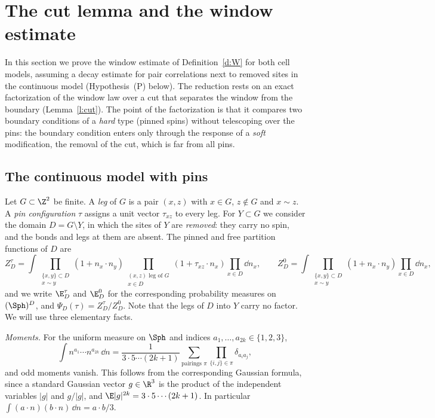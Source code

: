 \section{The cut lemma and the window estimate}\label{s:cut}

In this section we prove the window estimate of Definition~\ref{d:W} for both cell models, assuming a decay estimate for pair correlations next to removed sites in the continuous model (Hypothesis~(P) below). The reduction rests on an exact factorization of the window law over a cut that separates the window from the boundary (Lemma~\ref{l:cut}). The point of the factorization is that it compares two boundary conditions of a \emph{hard} type (pinned spins) without telescoping over the pins: the boundary condition enters only through the response of a \emph{soft} modification, the removal of the cut, which is far from all pins.

\subsection{The continuous model with pins}\label{s:contmodel}

Let $G \subset \Z^2$ be finite. A \emph{leg} of $G$ is a pair $(x, z)$ with $x \in G$, $z \notin G$ and $x \sim z$. A \emph{pin configuration} $\tau$ assigns a unit vector $\tau_{xz}$ to every leg. For $Y \subset G$ we consider the domain $D = G \setminus Y$, in which the sites of $Y$ are \emph{removed}: they carry no spin, and the bonds and legs at them are absent. The pinned and free partition functions of $D$ are
\begin{equation}\label{e:Zpin}
Z^\tau_D = \int \prod_{\substack{\{x, y\} \subset D \\ x \sim y}} (1 + n_x \cdot n_y) \prod_{\substack{(x, z) \text{ leg of } G \\ x \in D}} (1 + \tau_{xz} \cdot n_x) \prod_{x \in D} \dd n_x, \qquad Z^0_D = \int \prod_{\substack{\{x, y\} \subset D \\ x \sim y}} (1 + n_x \cdot n_y) \prod_{x \in D} \dd n_x ,
\end{equation}
and we write $\E^\tau_D$ and $\E^0_D$ for the corresponding probability measures on $(\Sph)^D$, and $\Psi_D(\tau) = Z^\tau_D / Z^0_D$. Note that the legs of $D$ into $Y$ carry no factor. We will use three elementary facts.

\emph{Moments.} For the uniform measure on $\Sph$ and indices $a_1, \dots, a_{2k} \in \{1, 2, 3\}$,
\begin{equation}\label{e:moments}
\int n^{a_1} \cdots n^{a_{2k}} \, \dd n = \frac{1}{3 \cdot 5 \cdots (2k + 1)} \sum_{\text{pairings } \pi} \prod_{\{i, j\} \in \pi} \delta_{a_i a_j},
\end{equation}
and odd moments vanish. This follows from the corresponding Gaussian formula, since a standard Gaussian vector $g \in \R^3$ is the product of the independent variables $|g|$ and $g / |g|$, and $\E |g|^{2k} = 3 \cdot 5 \cdots (2k + 1)$. In particular $\int (a \cdot n)(b \cdot n) \, \dd n = a \cdot b / 3$.

